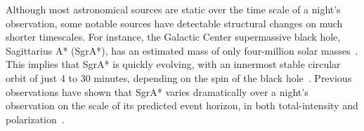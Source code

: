 

Although most %
astronomical sources are static over the time scale of a night's observation, 
some notable
sources have detectable structural changes on much shorter timescales. 
For instance,  the Galactic Center supermassive black hole, Sagittarius A* (SgrA*), has an estimated mass of only four-million solar masses~\cite{Ghez_2008}. %
This implies that SgrA* is quickly evolving, with an innermost stable circular orbit of just 4 to 30 minutes, depending on the spin of the black hole~\cite{orbitalperiod}. 
Previous observations have shown that SgrA* varies dramatically over a night's observation on the scale of its predicted event horizon, in both total-intensity and polarization~\cite{Fish_2011, Johnson_2015}. 

